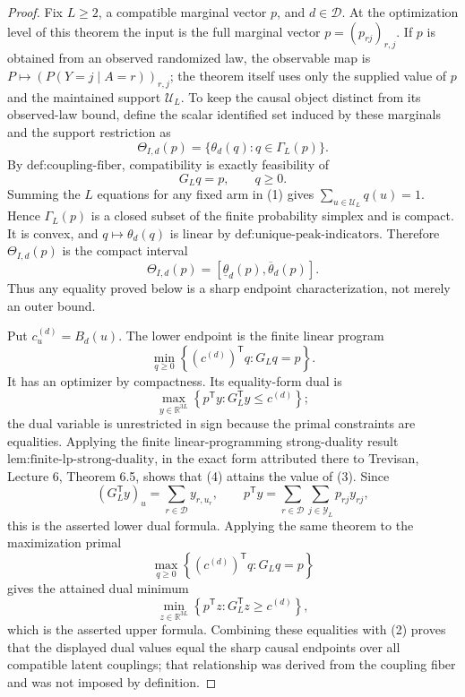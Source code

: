 \documentclass{article}
\begin{document}
\begin{proof}
Fix \(L\ge2\), a compatible marginal vector \(p\), and \(d\in\mathcal D\).  At the optimization level of this theorem the input is the full marginal vector \(p=(p_{rj})_{r,j}\).  If \(p\) is obtained from an observed randomized law, the observable map is \(P\mapsto(P(Y=j\mid A=r))_{r,j}\); the theorem itself uses only the supplied value of \(p\) and the maintained support \(\mathcal U_L\).  To keep the causal object distinct from its observed-law bound, define the scalar identified set induced by these marginals and the support restriction as
\[
 \Theta_{I,d}(p)=\{\theta_d(q):q\in\Gamma_L(p)\}.
\]
By \(\text{def:coupling-fiber}\), compatibility is exactly feasibility of
\[
 G_Lq=p,\qquad q\ge0.
 \tag{1}
\]
Summing the \(L\) equations for any fixed arm in (1) gives \(\sum_{u\in\mathcal U_L}q(u)=1\).  Hence \(\Gamma_L(p)\) is a closed subset of the finite probability simplex and is compact.  It is convex, and \(q\mapsto\theta_d(q)\) is linear by \(\text{def:unique-peak-indicators}\).  Therefore \(\Theta_{I,d}(p)\) is the compact interval
\[
 \Theta_{I,d}(p)=[\underline\theta_d(p),\overline\theta_d(p)].
 \tag{2}
\]
Thus any equality proved below is a sharp endpoint characterization, not merely an outer bound.

Put \(c^{(d)}_u=B_d(u)\).  The lower endpoint is the finite linear program
\[
 \min_{q\ge0}\left\{(c^{(d)})^{\mathsf T}q:G_Lq=p\right\}.
 \tag{3}
\]
It has an optimizer by compactness.  Its equality-form dual is
\[
 \max_{y\in\mathbb R^{3L}}
 \left\{p^{\mathsf T}y:G_L^{\mathsf T}y\le c^{(d)}\right\};
 \tag{4}
\]
the dual variable is unrestricted in sign because the primal constraints are equalities.  Applying the finite linear-programming strong-duality result \(\text{lem:finite-lp-strong-duality}\), in the exact form attributed there to Trevisan, Lecture 6, Theorem 6.5, shows that (4) attains the value of (3).  Since
\[
 (G_L^{\mathsf T}y)_u=\sum_{r\in\mathcal D}y_{r,u_r},
 \qquad
 p^{\mathsf T}y=\sum_{r\in\mathcal D}\sum_{j\in\mathcal Y_L}p_{rj}y_{rj},
\]
this is the asserted lower dual formula.  Applying the same theorem to the maximization primal
\[
 \max_{q\ge0}\left\{(c^{(d)})^{\mathsf T}q:G_Lq=p\right\}
\]
gives the attained dual minimum
\[
 \min_{z\in\mathbb R^{3L}}
 \left\{p^{\mathsf T}z:G_L^{\mathsf T}z\ge c^{(d)}\right\},
\]
which is the asserted upper formula.  Combining these equalities with (2) proves that the displayed dual values equal the sharp causal endpoints over all compatible latent couplings; that relationship was derived from the coupling fiber and was not imposed by definition.


\end{proof}
\end{document}
